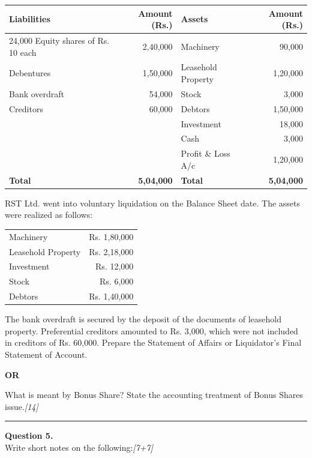 \documentclass[11pt,a4paper]{article}
\newcommand{\pts}[1]{\hfill   \textit{[#1]}}
\begin{document}
\begin{center}
\small
\renewcommand{\arraystretch}{1.2}

\begin{tabular}{|l|r|l|r|}
\hline
   \textbf{Liabilities} &   \textbf{Amount (Rs.)} &   \textbf{Assets} &   \textbf{Amount (Rs.)} \\ \hline
24,000 Equity shares of Rs. 10 each & 2,40,000 & Machinery & 90,000 \\
Debentures & 1,50,000 & Leasehold Property & 1,20,000 \\
Bank overdraft & 54,000 & Stock & 3,000 \\
Creditors & 60,000 & Debtors & 1,50,000 \\
& & Investment & 18,000 \\
& & Cash & 3,000 \\
& & Profit \& Loss A/c & 1,20,000 \\ \hline
   \textbf{Total} &   \textbf{5,04,000} &   \textbf{Total} &   \textbf{5,04,000} \\ \hline
\end{tabular}
\end{center}

RST Ltd. went into voluntary liquidation on the Balance Sheet date. The assets were realized as follows:

\begin{center}

\begin{tabular}{lr}
  Machinery & Rs. 1,80,000 \\
  Leasehold Property & Rs. 2,18,000 \\
  Investment & Rs. 12,000 \\
  Stock & Rs. 6,000 \\
  Debtors & Rs. 1,40,000 \\
\end{tabular}
\end{center}
The bank overdraft is secured by the deposit of the documents of leasehold property. Preferential creditors amounted to Rs. 3,000, which were not included in creditors of Rs. 60,000. Prepare the Statement of Affairs or Liquidator's Final Statement of Account.

\centerline{   \textbf{OR}}

What is meant by Bonus Share? State the accounting treatment of Bonus Shares issue.\pts{14}

\medskip\rule{\linewidth}{0.2pt}




\noindent   \textbf{Question 5.} \\
Write short notes on the following:\pts{7+7}
\end{document}
